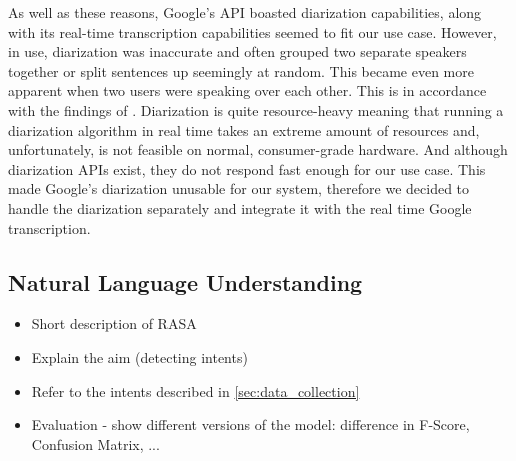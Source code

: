 \documentclass[hidelinks, 11pt]{article}
\begin{document}
As well as these reasons, Google's API boasted diarization capabilities, along with its real-time transcription capabilities seemed to fit our use case. However, in use, diarization was inaccurate and often grouped two separate speakers together or split sentences up seemingly at random. This became even more apparent when two users were speaking over each other. This is in accordance with the findings of \cite{addlesee_comprehensive_2020}. Diarization is quite resource-heavy meaning that running a diarization algorithm in real time takes an extreme amount of resources and, unfortunately, is not feasible on normal, consumer-grade hardware. And although diarization APIs exist, they do not respond fast enough for our use case. This made Google's diarization unusable for our system, therefore we decided to handle the diarization separately and integrate it with the real time Google transcription.

\subsection{Natural Language Understanding}
\label{subsec:nlu}

\begin{itemize}
  \item Short description of RASA
  \item Explain the aim (detecting intents)
  \item Refer to the intents described in \ref{sec:data_collection} 
  \item Evaluation - show different versions of the model: difference in F-Score, Confusion Matrix, ...
\end{itemize}
\end{document}
